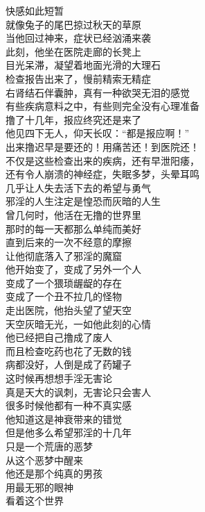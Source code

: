 \begin{poem}[撸没一生]
\begin{multicols}{2}
        快感如此短暂 \\ 就像兔子的尾巴掠过秋天的草原 \\ 当他回过神来，症状已经汹涌来袭 \\ 此刻，他坐在医院走廊的长凳上 \\ 目光呆滞，凝望着地面光滑的大理石 \\ 检查报告出来了，慢前精索无精症 \\ 右肾结石伴囊肿，真有一种欲哭无泪的感觉 \\ 有些疾病意料之中，有些则完全没有心理准备 \\ 撸了十几年，报应终究还是来了 \\ 他见四下无人，仰天长叹：“都是报应啊！” \\ 出来撸迟早是要还的！用痛苦还！到医院还！ \\ 不仅是这些检查出来的疾病，还有早泄阳痿， \\ 还有令人崩溃的神经症，失眠多梦，头晕耳鸣 \\ 几乎让人失去活下去的希望与勇气 \\ 邪淫的人生注定是惶恐而灰暗的人生 \\ 曾几何时，他活在无撸的世界里 \\ 那时的每一天都那么单纯而美好 \\ 直到后来的一次不经意的摩擦 \\ 让他彻底落入了邪淫的魔窟 \\ 他开始变了，变成了另外一个人 \\ 变成了一个猥琐龌龊的存在 \\ 变成了一个丑不拉几的怪物 \\ 走出医院，他抬头望了望天空 \\ 天空灰暗无光，一如他此刻的心情 \\ 他已经把自己撸成了废人 \\ 而且检查吃药也花了无数的钱 \\ 病都没好，人倒是成了药罐子 \\ 这时候再想想手淫无害论 \\ 真是天大的讽刺，无害论只会害人 \\ 很多时候他都有一种不真实感 \\ 他知道这是神衰带来的错觉 \\ 但是他多么希望邪淫的十几年 \\ 只是一个荒唐的恶梦 \\ 从这个恶梦中醒来 \\ 他还是那个纯真的男孩 \\ 用最无邪的眼神 \\ 看着这个世界
    \end{multicols}
\end{poem}

